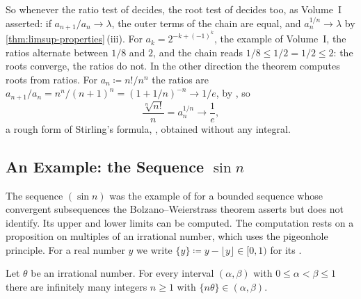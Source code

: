 So whenever the ratio test of  decides, the root test of  decides too, as Volume~I asserted: if $a_{n+1}/a_n\to\lambda$, the outer terms of the chain are equal, and $a_n^{1/n}\to\lambda$ by \cref{thm:limsup-properties}\,(iii). For $a_k=2^{-k+(-1)^k}$, the example of Volume~I, the ratios alternate between $1/8$ and $2$, and the chain reads $1/8\le1/2=1/2\le2$: the roots converge, the ratios do not. In the other direction the theorem computes roots from ratios. For $a_n\coloneqq n!/n^n$ the ratios are $a_{n+1}/a_n=n^n/(n+1)^n=(1+1/n)^{-n}\to1/e$, by , so
\[
\frac{\sqrt[n]{n!}}{n}=a_n^{1/n}\to\frac1e ,
\]
a rough form of Stirling's formula, , obtained without any integral.

\subsection{An Example: the Sequence \texorpdfstring{$\sin n$}{sin n}}

The sequence $(\sin n)$ was the example of  for a bounded sequence whose convergent subsequences the Bolzano--Weierstrass theorem asserts but does not identify. Its upper and lower limits can be computed. The computation rests on a proposition on multiples of an irrational number, which uses the pigeonhole principle. For a real number $y$ we write $\{y\}\coloneqq y-\lfloor y\rfloor\in[0,1)$ for its .

\begin{proposition}
\label{prop:fractional-dense}
Let $\theta$ be an irrational number. For every interval $(\alpha,\beta)$ with $0\le\alpha<\beta\le1$ there are infinitely many integers $n\ge1$ with $\{n\theta\}\in(\alpha,\beta)$.
\end{proposition}

